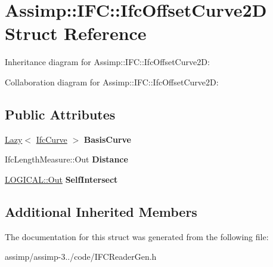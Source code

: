\hypertarget{struct_assimp_1_1_i_f_c_1_1_ifc_offset_curve2_d}{\section{Assimp\+:\+:I\+F\+C\+:\+:Ifc\+Offset\+Curve2\+D Struct Reference}
\label{struct_assimp_1_1_i_f_c_1_1_ifc_offset_curve2_d}
}


Inheritance diagram for Assimp\+:\+:I\+F\+C\+:\+:Ifc\+Offset\+Curve2\+D\+:


Collaboration diagram for Assimp\+:\+:I\+F\+C\+:\+:Ifc\+Offset\+Curve2\+D\+:
\subsection*{Public Attributes}
\begin{DoxyCompactItemize}
\item 
\hypertarget{struct_assimp_1_1_i_f_c_1_1_ifc_offset_curve2_d_ae2a178363076e39fb815520d4082d09e}{\hyperlink{struct_assimp_1_1_s_t_e_p_1_1_lazy}{Lazy}$<$ \hyperlink{struct_assimp_1_1_i_f_c_1_1_ifc_curve}{Ifc\+Curve} $>$ {\bfseries Basis\+Curve}}\label{struct_assimp_1_1_i_f_c_1_1_ifc_offset_curve2_d_ae2a178363076e39fb815520d4082d09e}

\item 
\hypertarget{struct_assimp_1_1_i_f_c_1_1_ifc_offset_curve2_d_a3bc743e5c0b2fe3a2d61e498f4a4b6f0}{Ifc\+Length\+Measure\+::\+Out {\bfseries Distance}}\label{struct_assimp_1_1_i_f_c_1_1_ifc_offset_curve2_d_a3bc743e5c0b2fe3a2d61e498f4a4b6f0}

\item 
\hypertarget{struct_assimp_1_1_i_f_c_1_1_ifc_offset_curve2_d_a09dc3b8af87fa5fd507af2735743130f}{\hyperlink{classboost_1_1shared__ptr}{L\+O\+G\+I\+C\+A\+L\+::\+Out} {\bfseries Self\+Intersect}}\label{struct_assimp_1_1_i_f_c_1_1_ifc_offset_curve2_d_a09dc3b8af87fa5fd507af2735743130f}

\end{DoxyCompactItemize}
\subsection*{Additional Inherited Members}


The documentation for this struct was generated from the following file\+:\begin{DoxyCompactItemize}
\item 
assimp/assimp-\/3../code/I\+F\+C\+Reader\+Gen.\+h\end{DoxyCompactItemize}
